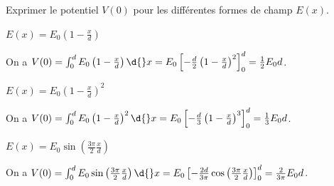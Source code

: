 \medskip

Exprimer le potentiel $V(0)$ pour les différentes formes de champ $E(x)$.

\debutEntrainement


\begin{enonce}
	$E(x) = E_0 \left( 1 - \frac{x}{d} \right)$
\end{enonce}


\begin{corrige}
On a $V(0) = \int_{0}^{d} E_0 \left( 1 - \frac{x}{d} \right) \d{}x = E_0 \left[ -\frac{d}{2}\left( 1 - \frac{x}{d} \right)^2  \right]^{d}_{0} = \frac{1}{2}E_0d$.
\end{corrige}




\begin{enonce}
	$E(x) = E_0 \left( 1 - \frac{x}{d} \right)^2$
\end{enonce}


\begin{corrige}
On a $V(0) = \int_{0}^{d} E_0 \left( 1 - \frac{x}{d} \right)^2 \d{}x = E_0 \left[ -\frac{d}{3}\left( 1 - \frac{x}{d} \right)^3  \right]^{d}_{0} = \frac{1}{3}E_0d$.
\end{corrige}




\begin{enonce}
	$E(x) = E_0 \sin\left( \frac{3\pi}{2}\frac{x}{d} \right)$
\end{enonce}


\begin{corrige}
On a $V(0) = \int_{0}^{d} E_0 \sin\left( \frac{3\pi}{2}\frac{x}{d} \right) \d{}x = E_0 \left[ -\frac{2d}{3\pi}\cos\left( \frac{3\pi}{2}\frac{x}{d} \right)  \right]^{d}_{0} = \frac{2}{3\pi}E_0d$.
\end{corrige}

